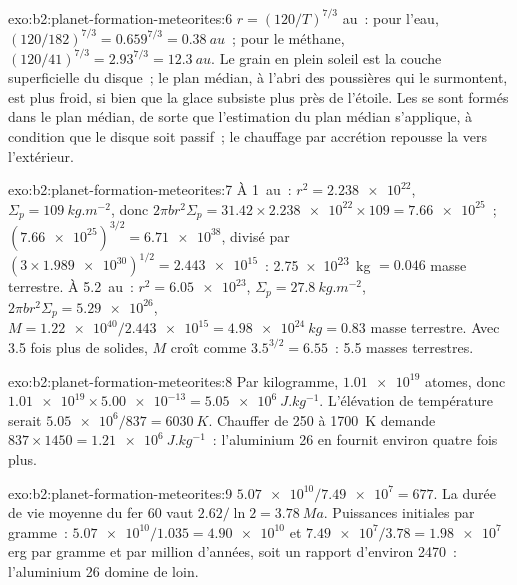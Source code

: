 \begin{solution}{exo:b2:planet-formation-meteorites:6}
$r = (120/T)^{7/3}$ au~: pour l'eau, $(120/182)^{7/3} = 0.659^{7/3} =
\qty{0.38}{au}$~; pour le méthane, $(120/41)^{7/3} = 2.93^{7/3} = \qty{12.3}{au}$.
Le grain en plein soleil est la couche superficielle du disque~; le plan médian, à l'abri des poussières qui le
surmontent, est plus froid, si bien que la glace subsiste plus près de l'étoile. Les  se sont formés dans le
plan médian, de sorte que l'estimation du plan médian s'applique, à condition que le disque soit passif~; le chauffage par
accrétion repousse la  vers l'extérieur.
\end{solution}

\begin{solution}{exo:b2:planet-formation-meteorites:7}
À \qty{1}{au}~: $r^2 = \num{2.238e22}$, $\Sigma_p = \qty{109}{kg.m^{-2}}$, donc
$2\pi b r^2\Sigma_p = 31.42\times\num{2.238e22}\times109 = \num{7.66e25}$~;
$(\num{7.66e25})^{3/2} = \num{6.71e38}$, divisé par
$(3\times\num{1.989e30})^{1/2} = \num{2.443e15}$~: \qty{2.75e23}{kg} $= 0.046$ masse
terrestre. À \qty{5.2}{au}~: $r^2 = \num{6.05e23}$,
$\Sigma_p = \qty{27.8}{kg.m^{-2}}$, $2\pi b r^2\Sigma_p = \num{5.29e26}$,
$M = \num{1.22e40}/\num{2.443e15} = \qty{4.98e24}{kg} = 0.83$ masse terrestre. Avec
\num{3.5} fois plus de solides, $M$ croît comme $3.5^{3/2} = 6.55$~: 5.5 masses
terrestres.
\end{solution}

\begin{solution}{exo:b2:planet-formation-meteorites:8}
Par kilogramme, $\num{1.01e19}$ atomes, donc
$\num{1.01e19}\times\num{5.00e-13} = \qty{5.05e6}{J.kg^{-1}}$. L'élévation de
température serait $\num{5.05e6}/837 = \qty{6030}{K}$. Chauffer de \num{250} à
\qty{1700}{K} demande $837\times1450 = \qty{1.21e6}{J.kg^{-1}}$~: l'aluminium 26 en
fournit environ quatre fois plus.
\end{solution}

\begin{solution}{exo:b2:planet-formation-meteorites:9}
$\num{5.07e10}/\num{7.49e7} = 677$. La durée de vie moyenne du fer 60 vaut
$2.62/\ln2 = \qty{3.78}{Ma}$. Puissances initiales par gramme~:
$\num{5.07e10}/1.035 = \num{4.90e10}$ et $\num{7.49e7}/3.78 = \num{1.98e7}$ erg par gramme et par
million d'années, soit un rapport d'environ \num{2470}~: l'aluminium 26 domine de loin.
\end{solution}

